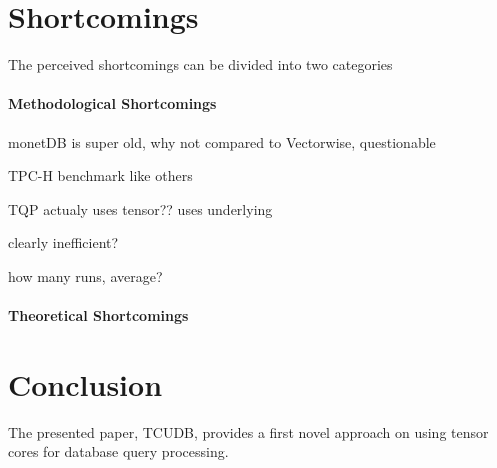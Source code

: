 \documentclass{paper}
\begin{document}
	
	\section{Shortcomings}
	
	The perceived shortcomings can be divided into two categories
	
	\paragraph{Methodological Shortcomings}

	monetDB is super old, why not compared to Vectorwise, questionable 

TPC-H benchmark like others

TQP actualy uses tensor?? uses underlying

clearly inefficient? 

how many runs, average?
	
	\paragraph{Theoretical Shortcomings}
	

	
	
	\section{Conclusion}
	
	The presented paper, TCUDB, provides a first novel approach on using tensor cores for database query processing. 
	


	
\end{document}
